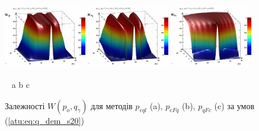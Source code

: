 \begin{figure}[htb!]
  \begin{center}
    \includegraphics[width=0.32\textwidth]{p/qls_pe-p_po_qg_Wql_s20.png}
    \hfill
    \includegraphics[width=0.32\textwidth]{p/qls_pe-p_po_qg_WFq_s20.png}
    \hfill
    \includegraphics[width=0.32\textwidth]{p/qls_pe-p_po_qg_WFc_s20.png}
  \end{center}
  \vspace{-1.0ex}
  \begin{center}
    ~ \hfill a \hfill\hfill b \hfill\hfill c \hfill ~
  \end{center}
  \vspace{-1.5ex}
  \caption{Залежності $W(p_o,q_\gamma)$ для методів $p_{eql}$ (a), $p_{eFq}$ (b), $p_{qFc}$ (c) за умов (\ref{atu:eq:q_dem_s20})}
  \label{atu:f:qsl_W_po_qg_s20}
\end{figure}

